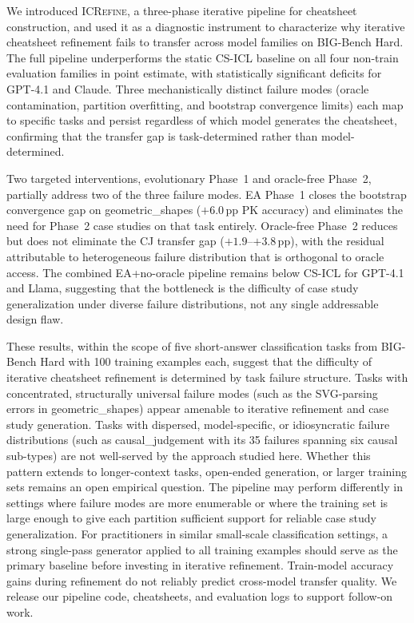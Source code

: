 \documentclass{article}
\begin{document}
We introduced \textsc{ICRefine}, a three-phase iterative pipeline for cheatsheet
construction, and used it as a diagnostic instrument to characterize why iterative
cheatsheet refinement fails to transfer across model families on BIG-Bench Hard.
The full pipeline underperforms the static CS-ICL baseline on all four non-train evaluation
families in point estimate, with statistically significant deficits for GPT-4.1 and Claude.
Three mechanistically distinct failure modes (oracle contamination, partition overfitting, and
bootstrap convergence limits) each map to specific tasks and persist regardless of which
model generates the cheatsheet, confirming that the transfer gap is task-determined rather
than model-determined.

Two targeted interventions, evolutionary Phase~1 and oracle-free Phase~2, partially
address two of the three failure modes.
EA Phase~1 closes the bootstrap convergence gap on geometric\_shapes ($+6.0$\,pp PK
accuracy) and eliminates the need for Phase~2 case studies on that task entirely.
Oracle-free Phase~2 reduces but does not eliminate the CJ transfer gap ($+1.9$--$+3.8$\,pp),
with the residual attributable to heterogeneous failure distribution that is orthogonal to
oracle access.
The combined EA+no-oracle pipeline remains below CS-ICL for GPT-4.1 and Llama, suggesting
that the bottleneck is the difficulty of case study generalization under diverse failure
distributions, not any single addressable design flaw.

These results, within the scope of five short-answer classification tasks from BIG-Bench
Hard with 100 training examples each, suggest that the difficulty of iterative cheatsheet
refinement is determined by task failure structure.
Tasks with concentrated, structurally universal failure modes (such as the SVG-parsing errors in geometric\_shapes) appear
amenable to iterative refinement and case study generation.
Tasks with dispersed, model-specific, or idiosyncratic failure distributions (such as causal\_judgement with its
35 failures spanning six causal sub-types) are not well-served by the approach studied here.
Whether this pattern extends to longer-context tasks, open-ended generation, or larger
training sets remains an open empirical question.
The pipeline may perform differently in settings where failure modes are more enumerable or
where the training set is large enough to give each partition sufficient support for reliable case study generalization.
For practitioners in similar small-scale classification settings, a strong single-pass generator applied to all training examples should serve as the primary baseline before investing in iterative refinement.
Train-model accuracy gains during refinement do not reliably predict cross-model transfer quality.
We release our pipeline code, cheatsheets, and evaluation logs to support follow-on work.
\end{document}
